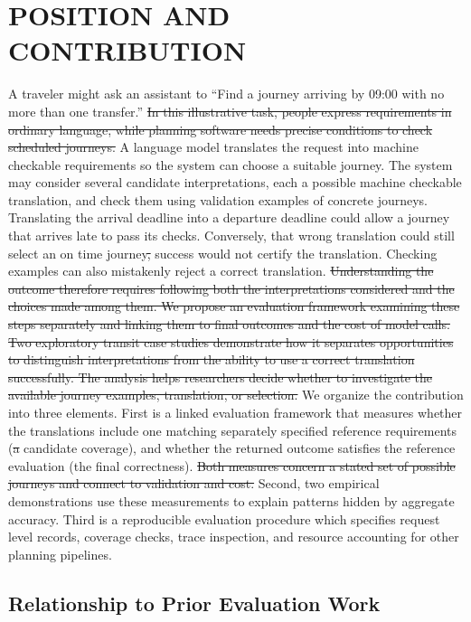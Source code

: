 \documentclass[a4paper,twoside]{article}
\providecommand{\DIFaddtex}[1]{{\protect\color{blue}\uwave{#1}}} %
\providecommand{\DIFdeltex}[1]{{\protect\color{red}\sout{#1}}}                      %
\providecommand{\DIFaddbegin}{} %
\providecommand{\DIFaddend}{} %
\providecommand{\DIFdelbegin}{} %
\providecommand{\DIFdelend}{} %
\providecommand{\DIFadd}[1]{\texorpdfstring{\DIFaddtex{#1}}{#1}} %
\providecommand{\DIFdel}[1]{\texorpdfstring{\DIFdeltex{#1}}{}} %
\begin{document}
\section{\uppercase{Position and Contribution}}
\label{sec:position}
\noindent A traveler might ask an assistant to ``Find a journey arriving by 09:00 with no more than one transfer.'' \DIFdelbegin \DIFdel{In this illustrative task, people express requirements in ordinary language, while planning software needs precise conditions to check scheduled journeys. }\DIFdelend A language model translates the request into machine checkable requirements so the system can choose a suitable journey.
The system may consider several candidate interpretations, each a possible machine checkable translation, and check them using validation examples of concrete journeys. Translating the arrival deadline into a departure deadline could allow a journey that arrives late to pass its checks. Conversely, that wrong translation could still select an on time journey\DIFdelbegin \DIFdel{, }\DIFdelend \DIFaddbegin \DIFadd{; }\DIFaddend success would not certify the translation. Checking examples can also mistakenly reject a correct translation. 
\DIFdelbegin \DIFdel{Understanding the outcome therefore requires following both the interpretations considered and the choices made among them.
We propose an evaluation framework examining these steps separately and linking them to final outcomes and the cost of model calls. Two exploratory transit case studies demonstrate how it separates opportunities to distinguish interpretations from the ability to use a correct translation successfully. The analysis helps researchers decide whether to investigate the available journey examples, translation, or selection. }\DIFdelend We organize the contribution into three elements.
First is a linked evaluation framework that measures whether the translations include one matching separately specified reference requirements (\DIFdelbegin \DIFdel{a }\DIFdelend candidate coverage), and whether the returned outcome satisfies the reference evaluation (the final correctness).
\DIFdelbegin \DIFdel{Both measures concern a stated set of possible journeys and connect to validation and cost.
}\DIFdelend Second, two empirical demonstrations use these measurements to explain patterns hidden by aggregate accuracy.
Third is a reproducible evaluation procedure which specifies request level records, coverage checks, trace inspection, and resource accounting for other planning pipelines.


\subsection{Relationship to Prior Evaluation Work}
\end{document}
